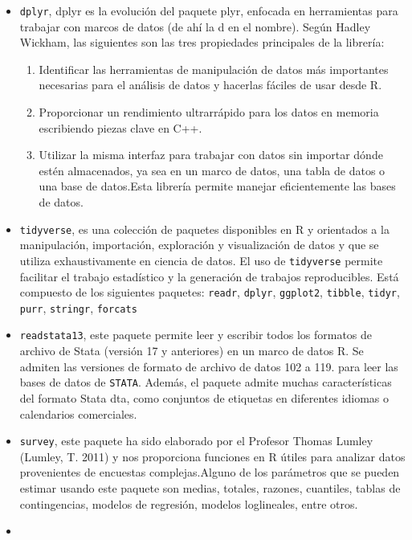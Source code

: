 \documentclass[
  spanish,
  12pt,
]{book}
\begin{document}
\begin{itemize}
\item
  \texttt{dplyr}, dplyr es la evolución del paquete plyr, enfocada en herramientas para trabajar con marcos de datos (de ahí la d en el nombre). Según Hadley Wickham, las siguientes son las tres propiedades principales de la librería:

  \begin{enumerate}
  \def\labelenumi{\arabic{enumi})}
  \item
    Identificar las herramientas de manipulación de datos más importantes necesarias para el análisis de datos y hacerlas fáciles de usar desde R.
  \item
    Proporcionar un rendimiento ultrarrápido para los datos en memoria escribiendo piezas clave en C++.
  \item
    Utilizar la misma interfaz para trabajar con datos sin importar dónde estén almacenados, ya sea en un marco de datos, una tabla de datos o una base de datos.Esta librería permite manejar eficientemente las bases de datos.
  \end{enumerate}
\item
  \texttt{tidyverse}, es una colección de paquetes disponibles en R y orientados a la manipulación, importación, exploración y visualización de datos y que se utiliza exhaustivamente en ciencia de datos. El uso de \texttt{tidyverse} permite facilitar el trabajo estadístico y la generación de trabajos reproducibles. Está compuesto de los siguientes paquetes: \texttt{readr}, \texttt{dplyr}, \texttt{ggplot2}, \texttt{tibble}, \texttt{tidyr}, \texttt{purr}, \texttt{stringr}, \texttt{forcats}
\item
  \texttt{readstata13}, este paquete permite leer y escribir todos los formatos de archivo de Stata (versión 17 y anteriores) en un marco de datos R. Se admiten las versiones de formato de archivo de datos 102 a 119. para leer las bases de datos de \texttt{STATA}. Además, el paquete admite muchas características del formato Stata dta, como conjuntos de etiquetas en diferentes idiomas o calendarios comerciales.
\item
  \texttt{survey}, este paquete ha sido elaborado por el Profesor Thomas Lumley (Lumley, T. 2011) y nos proporciona funciones en R útiles para analizar datos provenientes de encuestas complejas.Alguno de los parámetros que se pueden estimar usando este paquete son medias, totales, razones, cuantiles, tablas de contingencias, modelos de regresión, modelos loglineales, entre otros.
\item

\end{itemize}
\end{document}
